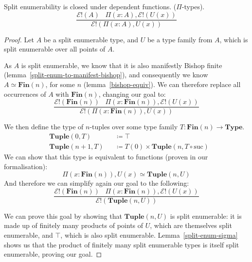 \begin{lemma}
  Split enumerability is closed under dependent functions.
  (\(\Pi\)-types).
  \begin{equation}
    \frac{
      \mathcal{E}!(A) \; \; \; \Pi {(x : A)} , \mathcal{E}!\left( U(x) \right)
    }{
      \mathcal{E}!\left(\Pi {(x : A)} , U(x)\right)
    }
  \end{equation}
\end{lemma}
\begin{proof}
  Let \(A\) be a split enumerable type, and \(U\) be a type family from \(A\),
  which is split enumerable over all points of \(A\).

  As \(A\) is split enumerable, we know that it is also manifestly Bishop finite
  (lemma~\ref{split-enum-to-manifest-bishop}), and consequently we know \(A
  \simeq \mathbf{Fin}(n)\), for some \(n\) (lemma~\ref{bishop-equiv}).
  We can therefore replace all occurrences of \(A\) with \(\mathbf{Fin}(n)\),
  changing our goal to:
  \begin{equation}
    \frac{
      \mathcal{E}!(\mathbf{Fin}(n)) \; \; \; \Pi (x : \mathbf{Fin}(n)) , \mathcal{E}!\left( U(x) \right)
    }{
      \mathcal{E}!\left(\Pi (x : \mathbf{Fin}(n)) , U(x)\right)
    }
  \end{equation}
  
  We then define the type of \(n\)-tuples over some type family \(T :
  \mathbf{Fin}(n) \rightarrow \mathbf{Type}\).
  \begin{equation}
    \begin{alignedat}{3}
      & \mathbf{Tuple}(0, T)   &&\coloneqq \top \\
      & \mathbf{Tuple}(n+1, T) &&\coloneqq T(0) \times \mathbf{Tuple}(n, T \circ \text{suc})
    \end{alignedat}
  \end{equation}
  We can show that this type is equivalent to functions (proven in our formalisation):
  \begin{equation}
    \Pi(x : \mathbf{Fin}(n)) , U(x) \simeq \mathbf{Tuple}(n, U)
  \end{equation}
  And therefore we can simplify again our goal to the following:
  \begin{equation}
    \frac{
      \mathcal{E}!(\mathbf{Fin}(n)) \; \; \; \Pi (x : \mathbf{Fin}(n)) , \mathcal{E}!\left( U(x) \right)
    }{
      \mathcal{E}!\left(\mathbf{Tuple}(n, U)\right)
    }
  \end{equation}
  
  We can prove this goal by showing that \(\mathbf{Tuple}(n, U)\) is split
  enumerable: it is made up of finitely many products of points of \(U\), which
  are themselves split enumerable, and \(\top\), which is also split enumerable.
  Lemma~\ref{split-enum-sigma} shows us that the product of finitely many split
  enumerable types is itself split enumerable, proving our goal.
\end{proof}


